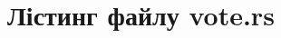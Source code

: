 \documentclass[14pt]{extreport}
\newcommand{\nocontentsline}[3]{}
\newcommand{\tocless}[2]{\bgroup\let\addcontentsline=\nocontentsline#1{#2}\egroup}
\begin{document}
  \begin{multicols}{2}
  {
  
  }
  \end{multicols}
  
  \tocless\section{Лістинг файлу vote.rs}
  
  \begin{multicols}{2}
  {
  
  }
  \end{multicols}
  
  \tocless\section{Лістинг файлу votingsdapp-ui.tsx}
  
\end{document}
